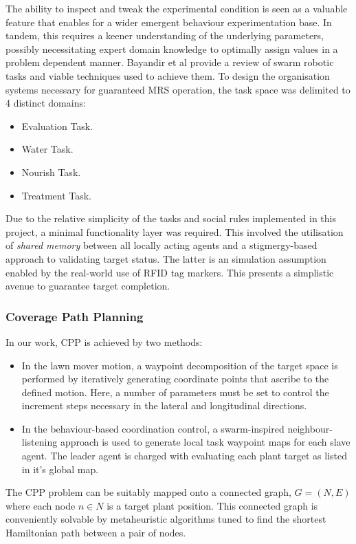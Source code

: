 \documentclass{report}
\begin{document}
The ability to inspect and tweak the experimental condition is seen as a valuable feature that enables for a wider emergent behaviour experimentation base. In tandem, this requires a keener understanding of the underlying parameters, possibly necessitating expert domain knowledge to optimally assign values in a problem dependent manner. Bayandir et al \cite{Bayindir2016} provide a review of swarm robotic tasks and viable techniques used to achieve them. To design the organisation systems necessary for guaranteed MRS operation, the task space was delimited to 4 distinct domains:
\begin{itemize}
	\item Evaluation Task.
	\item Water Task.
	\item Nourish Task.
	\item Treatment Task.
\end{itemize}

Due to the relative simplicity of the tasks and social rules implemented in this project, a minimal functionality layer was required. This involved the utilisation of \textit{shared memory} between all locally acting agents and a stigmergy-based approach to validating target status. The latter is an simulation assumption enabled by the real-world use of RFID tag markers. This presents a simplistic avenue to guarantee target completion.

\subsubsection{Coverage Path Planning}
In our work, CPP is achieved by two methods:
\begin{itemize}
	\item In the lawn mover motion, a waypoint decomposition of the target space is performed by iteratively generating coordinate points that ascribe to the defined motion. Here, a number of parameters must be set to control the increment steps necessary in the lateral and longitudinal directions.
	\item In the behaviour-based coordination control, a swarm-inspired neighbour-listening approach is used to generate local task waypoint maps for each slave agent. The leader agent is charged with evaluating each plant target as listed in it’s global map.
\end{itemize}

The CPP problem can be suitably mapped onto a connected graph, \textit{$G = (N, E)$} where each node \textit{$n \in N$} is a target plant position. This connected graph is conveniently solvable by metaheuristic algorithms tuned to find the shortest Hamiltonian path between a pair of nodes.
\end{document}
